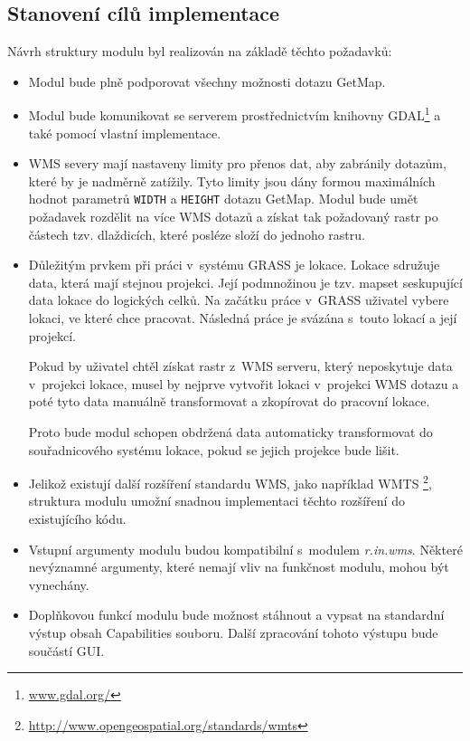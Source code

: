 \documentclass[a4paper,12pt]{article}
\begin{document}
\newpage

\subsection{Stanovení cílů implementace}

Návrh struktury modulu byl realizován na základě těchto požadavků:
\begin{itemize}
  \item Modul bude plně podporovat všechny možnosti dotazu GetMap.
  \item Modul bude komunikovat se serverem prostřednictvím knihovny
    GDAL\footnote{\url{www.gdal.org/}} a také pomocí vlastní
    implementace.
  \item WMS severy mají nastaveny limity pro přenos dat, aby zabránily
    dotazům, které by je nadměrně zatížily. Tyto limity jsou dány
    formou maximálních hodnot parametrů {\tt WIDTH} a {\tt HEIGHT} dotazu GetMap.
    Modul bude umět požadavek rozdělit na více WMS dotazů a získat tak
    požadovaný rastr po částech tzv. dlaždicích, které posléze složí do
    jednoho rastru.
  \item Důležitým prvkem při práci v~systému GRASS je
    lokace. Lokace sdružuje data, která mají stejnou projekci. Její
    podmnožinou je tzv. mapset seskupující data lokace do logických
    celků.  Na začátku práce v~GRASS uživatel vybere lokaci, ve
    které chce pracovat. Následná práce je svázána s~touto lokací a
    její projekcí.
 
    Pokud by uživatel chtěl získat rastr z~WMS serveru, který
    neposkytuje data v~projekci lokace, musel by nejprve vytvořit
    lokaci v~projekci WMS dotazu a poté tyto data manuálně
    transformovat a zkopírovat do pracovní lokace.
    
    Proto bude modul schopen obdržená data automaticky transformovat
    do souřadnicového systému lokace, pokud se jejich projekce bude
    lišit.
  \item Jelikož existují další rozšíření standardu WMS, jako například
    WMTS \footnote{\url{http://www.opengeospatial.org/standards/wmts}},
    struktura modulu umožní snadnou implementaci těchto rozšíření do
    existujícího kódu.
  \item Vstupní argumenty modulu budou kompatibilní s~modulem
    \emph{r.in.wms}. Některé nevýznamné argumenty, které nemají vliv na
    funkčnost modulu, mohou být vynechány.
  \item Doplňkovou funkcí modulu bude možnost stáhnout a vypsat na
    standardní výstup obsah Capabilities souboru. Další zpracování
    tohoto výstupu bude součástí GUI.
 \end{itemize}
\end{document}
